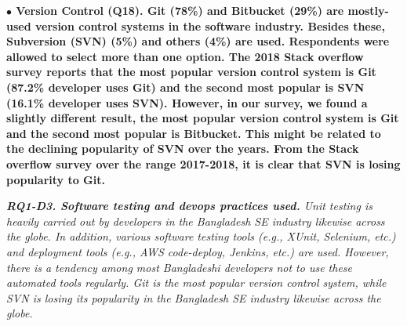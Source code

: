 \nd\bf{$\bullet$ Version Control (Q18).} Git (78\%) and Bitbucket (29\%) are mostly-used
version control systems in the software industry.%
 Besides these, Subversion (SVN) (5\%) and others (4\%)
are used.  Respondents were allowed to select more than one option. The 2018
Stack overflow survey\citep{StackoverflowSurvey2018} reports that the most
popular version control system is Git (87.2\% developer uses Git) and the second
most popular is SVN (16.1\% developer uses SVN). However, in our survey, we
found a slightly different result, the most popular version control system is
Git and the second most popular is Bitbucket. This might be related to the
declining popularity of SVN over the years. From the Stack overflow survey over
the range 2017-2018, it is clear that SVN is losing popularity to Git. 

\begin{tcolorbox}[flushleft upper,boxrule=1pt,arc=0pt,left=0pt,right=0pt,top=0pt,bottom=0pt,colback=white,after=\ignorespacesafterend\par\noindent]
\nd\it{\bf{RQ1-D3. Software testing and devops practices used.}} Unit testing is
heavily carried out by developers in the Bangladesh SE industry likewise across
the globe. In addition, various software testing
tools (e.g., XUnit, Selenium, etc.) and deployment tools (e.g., AWS code-deploy,
Jenkins, etc.) are used. However, there is a tendency among most
Bangladeshi developers not to use these automated tools regularly. 
Git is the most popular version control system, while SVN is losing
its popularity in the Bangladesh SE industry likewise across the globe.
\end{tcolorbox}
